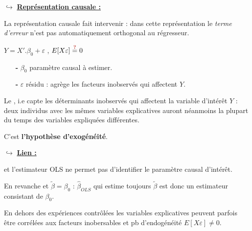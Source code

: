\noindent $\hookrightarrow$ \underline{\textbf{Représentation causale :}}\par
La représentation causale fait intervenir  : dans cette représentation le \textit{terme d'erreur} n'est pas automatiquement orthogonal au régresseur.\par
\begin{boxH}
    $Y = X'.\beta_{0} + \varepsilon$ , $E[X\varepsilon]\overset{\textbf{\red{?}}}{=}0$\par
    \begin{itemize}
        \item[\textbf{-}] $\beta_{0}$ paramètre causal à estimer.\par
        \item[\textbf{-}] $\varepsilon$ résidu : agrège les facteurs inobservés qui affectent $Y$.
    \end{itemize}
\end{boxH}
Le , i.e capte les déterminants inobservés qui affectent la variable d'intérêt $Y$ : deux individus avec les mêmes variables explicatives auront néanmoins la plupart du temps des variables expliquées différentes.\par
{} C'est \textbf{l'hypothèse d'exogénéité}.
\bigbreak


\noindent $\hookrightarrow$ \underline{\textbf{Lien :}}\par
{} et l'estimateur OLS ne permet pas d'identifier le paramètre causal d'intérêt.\par
En revanche  et $\widetilde{\beta} = \beta_{0}$ : $\widehat{\beta}_{OLS}$ qui estime toujours $\widetilde{\beta}$ est donc un estimateur consistant de $\beta_{0}$.\par
En dehors des expériences contrôlées les variables explicatives peuvent parfois être corrélées aux facteurs inobersables et pb d'endogénéité $E[X\varepsilon]\neq 0$.
\bigbreak


